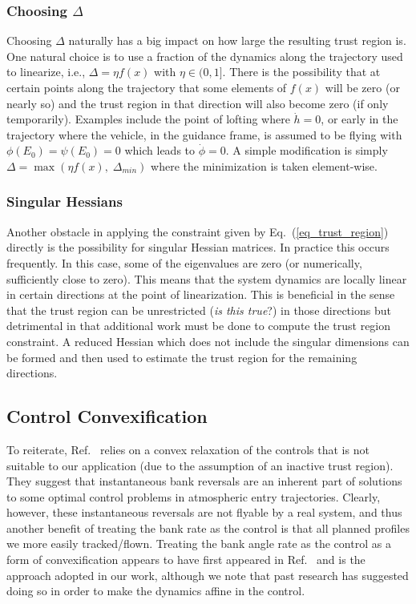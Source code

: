 \documentclass[10pt,a4paper]{article}
\begin{document}
	\subsubsection{Choosing $ \Delta $}
	Choosing $\Delta$ naturally has a big impact on how large the resulting trust region is. One natural choice is to use a fraction of the dynamics along the trajectory used to linearize, i.e., $\Delta = \eta f(x)$ with $\eta\in(0,1]$. There is the possibility that at certain points along the trajectory that some elements of $f(x)$ will be zero (or nearly so) and the trust region in that direction will also become zero (if only temporarily). Examples include the point of lofting where $\dot{h}=0$, or early in the trajectory where the vehicle, in the guidance frame, is assumed to be flying with $\phi(E_0)=\psi(E_0)=0$ which leads to $\dot{\phi}=0$. A simple modification is simply $\Delta = \max(\eta f(x),\; \Delta_{min})$ where the minimization is taken element-wise.
	\subsubsection{Singular Hessians }
	Another obstacle in applying the constraint given by Eq.~(\ref{eq_trust_region}) directly is the possibility for singular Hessian matrices. In practice this occurs frequently. In this case, some of the eigenvalues are zero (or numerically, sufficiently close to zero). This means that the system dynamics are locally linear in certain directions at the point of linearization. This is beneficial in the sense that the trust region can be unrestricted (\textit{is this true}?) in those directions but detrimental in that additional work must be done to compute the trust region constraint. A reduced Hessian which does not include the singular dimensions can be formed and then used to estimate the trust region for the remaining directions.
	
	\subsection{Control Convexification}
	To reiterate, Ref.~\cite{SOCP Lu} relies on a convex relaxation of the controls that is not suitable to our application (due to the assumption of an inactive trust region). They suggest that instantaneous bank reversals are an inherent part of solutions to some optimal control problems in atmospheric entry trajectories. Clearly, however, these instantaneous reversals are not flyable by a real system, and thus another benefit of treating the bank rate as the control is that all planned profiles we more easily tracked/flown. Treating the bank angle rate as the control as a form of convexification appears to have first appeared in Ref.~\cite{SOCP WangGrant} and is the approach adopted in our work, although we note that past research has suggested doing so in order to make the dynamics affine in the control.
	
\end{document}
